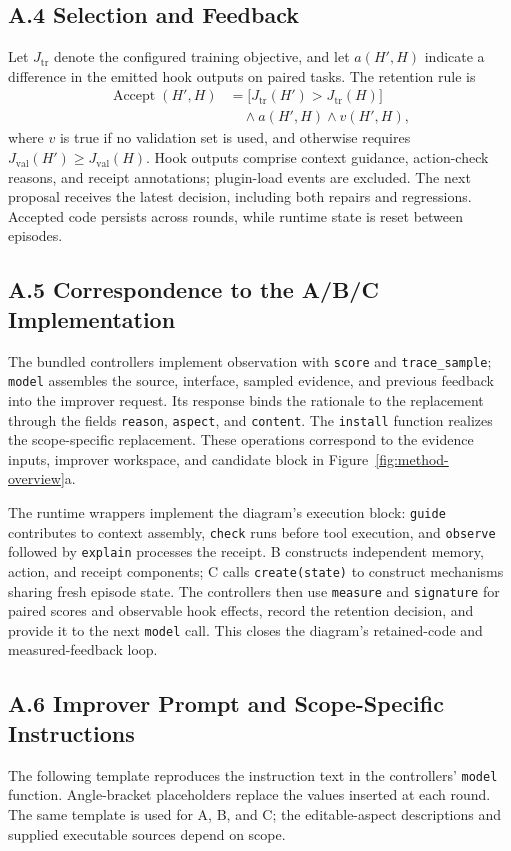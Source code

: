 \subsection*{A.4 Selection and Feedback}
Let $J_{\mathrm{tr}}$ denote the configured training objective, and let $a(H',H)$ indicate a difference in the emitted hook outputs on paired tasks. The retention rule is
\[
\begin{aligned}
\operatorname{Accept}(H',H)&=
\big[J_{\mathrm{tr}}(H')>J_{\mathrm{tr}}(H)\big]
\\
&\quad\land a(H',H)\land v(H',H),
\end{aligned}
\]
where $v$ is true if no validation set is used, and otherwise requires $J_{\mathrm{val}}(H')\geq J_{\mathrm{val}}(H)$. Hook outputs comprise context guidance, action-check reasons, and receipt annotations; plugin-load events are excluded. The next proposal receives the latest decision, including both repairs and regressions. Accepted code persists across rounds, while runtime state is reset between episodes.


\subsection*{A.5 Correspondence to the A/B/C Implementation}
The bundled controllers implement observation with \texttt{score} and \texttt{trace\_sample}; \texttt{model} assembles the source, interface, sampled evidence, and previous feedback into the improver request. Its response binds the rationale to the replacement through the fields \texttt{reason}, \texttt{aspect}, and \texttt{content}. The \texttt{install} function realizes the scope-specific replacement. These operations correspond to the evidence inputs, improver workspace, and candidate block in Figure~\ref{fig:method-overview}a.

The runtime wrappers implement the diagram's execution block: \texttt{guide} contributes to context assembly, \texttt{check} runs before tool execution, and \texttt{observe} followed by \texttt{explain} processes the receipt. B constructs independent memory, action, and receipt components; C calls \texttt{create(state)} to construct mechanisms sharing fresh episode state. The controllers then use \texttt{measure} and \texttt{signature} for paired scores and observable hook effects, record the retention decision, and provide it to the next \texttt{model} call. This closes the diagram's retained-code and measured-feedback loop.


\subsection*{A.6 Improver Prompt and Scope-Specific Instructions}
The following template reproduces the instruction text in the controllers' \texttt{model} function. Angle-bracket placeholders replace the values inserted at each round. The same template is used for A, B, and C; the editable-aspect descriptions and supplied executable sources depend on scope.


